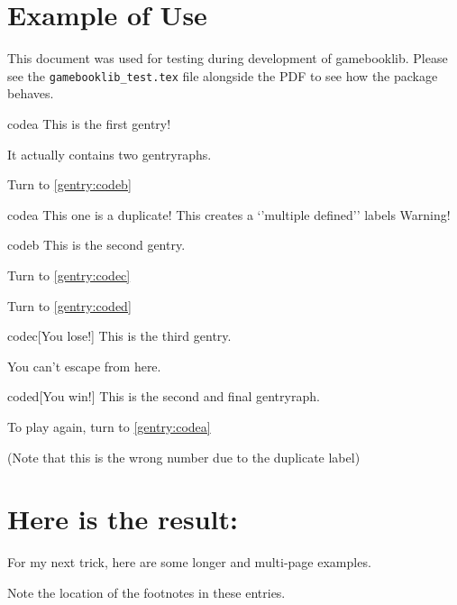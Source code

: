 \documentclass{report}
\begin{document}
\newcommand{\turnto}[1]{\ref{gentry:#1}\par}

\section*{Example of Use}

This document was used for testing during development of gamebooklib.
Please see the \texttt{gamebooklib\_test.tex} file alongside the PDF
to see how the package behaves.

\begin{gentry}{codea}
  This is the first gentry!

  It actually contains two gentryraphs.
  
Turn to \turnto{codeb}
\end{gentry}

\begin{gentry}{codea}
  This one is a duplicate! This creates a `'multiple defined'' labels Warning!
\end{gentry}

\begin{gentry}{codeb}
  This is the second gentry.
  
  Turn to \turnto{codec}
  
Turn to \turnto{coded}
\end{gentry}

\begin{gentry}{codec}[You lose!]
  This is the third gentry.

  You can't escape from here.
\end{gentry}

\begin{gentry}[123]{coded}[You win!]
  This is the second and final gentryraph.
  
  To play again, turn to \turnto{codea}
  
  (Note that this is the wrong number due to the duplicate label)
\end{gentry}

\section*{Here is the result:}

\thegentries
\eject

For my next trick, here are some longer and multi-page examples.

Note the location of the footnotes in these entries.
\end{document}
